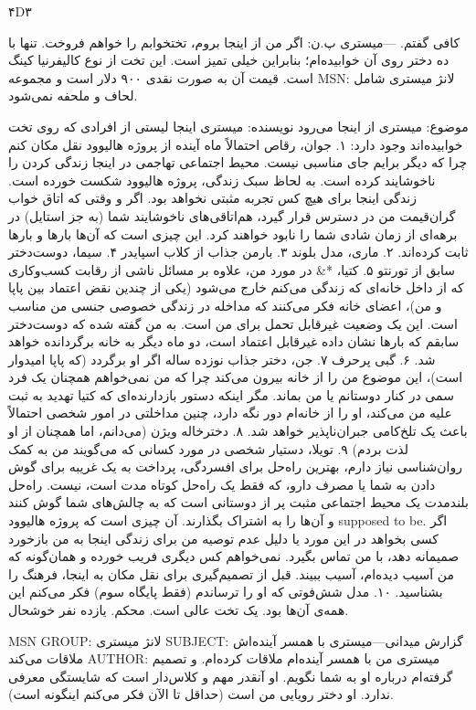 ۴D۳

کافی گفتم.
—میستری
پ.ن: اگر من از اینجا بروم، تختخوابم را خواهم فروخت. تنها با ده دختر روی آن خوابیده‌ام؛ بنابراین خیلی تمیز است. این تخت از نوع کالیفرنیا کینگ است. قیمت آن به صورت نقدی ۹۰۰ دلار است و مجموعه MSN: لانژ میستری شامل لحاف و ملحفه نمی‌شود.

موضوع: میستری از اینجا می‌رود
نویسنده: میستری
اینجا لیستی از افرادی که روی تخت خوابیده‌اند وجود دارد:
۱. جوان، رقاص
احتمالاً ماه آینده از پروژه هالیوود نقل مکان کنم چرا که دیگر برایم جای مناسبی نیست. محیط اجتماعی تهاجمی در اینجا زندگی کردن را ناخوشایند کرده است.
به لحاظ سبک زندگی، پروژه هالیوود شکست خورده است. زندگی اینجا برای هیچ کس تجربه مثبتی نخواهد بود. اگر و وقتی که اتاق خواب گران‌قیمت من در دسترس قرار گیرد، هم‌اتاقی‌های ناخوشایند شما (به جز استایل) در برهه‌ای از زمان شادی شما را نابود خواهند کرد. این چیزی است که آن‌ها بارها و بارها ثابت کرده‌اند.  
۲. ماری، مدل بلوند  
۳. بارمن جذاب از کلاب اسپایدر  
۴. سیما، دوست‌دختر سابق از تورنتو  
۵. کتیا، *&%
در مورد من، علاوه بر مسائل ناشی از رقابت کسب‌وکاری که از داخل خانه‌ای که زندگی می‌کنم خارج می‌شود (یكی از چندین نقض اعتماد بین پاپا و من)، اعضای خانه فکر می‌کنند که مداخله در زندگی خصوصی جنسی من مناسب است. این یک وضعیت غیرقابل تحمل برای من است. به من گفته شده که دوست‌دختر سابقم که بارها نشان داده غیرقابل اعتماد است، دو ماه دیگر به خانه برگردانده خواهد شد.  
۶. گبی پرحرف  
۷. جن، دختر جذاب نوزده ساله  
اگر او برگردد (که پاپا امیدوار است)، این موضوع من را از خانه بیرون می‌کند چرا که من نمی‌خواهم همچنان یک فرد سمی در کنار دوستانم یا من بماند. مگر اینکه دستور بازدارنده‌ای که کتیا تهدید به ثبت علیه من می‌کند، او را از خانه‌ام دور نگه دارد، چنین مداخلتی در امور شخصی احتمالاً باعث یک تلخ‌کامی جبران‌ناپذیر خواهد شد.  
۸. دخترخاله ویژن  (می‌دانم، اما همچنان از او لذت بردم)  
۹. تویلا، دستیار شخصی  
در مورد کسانی که می‌گویند من به کمک روان‌شناسی نیاز دارم، بهترین راه‌حل برای افسردگی، پرداخت به یک غریبه برای گوش دادن به شما یا مصرف دارو، که فقط یک راه‌حل کوتاه مدت است، نیست. راه‌حل بلندمدت یک محیط اجتماعی مثبت پر از دوستانی است که به چالش‌های شما گوش کنند و آن‌ها را به اشتراک بگذارند. آن چیزی است که پروژه هالیوود supposed to be. اگر کسی بخواهد در این مورد یا دلیل عدم توصیه من برای زندگی اینجا به من بازخورد صمیمانه دهد، با من تماس بگیرد. نمی‌خواهم کس دیگری فریب خورده و همان‌گونه که من آسیب دیده‌ام، آسیب ببیند. قبل از تصمیم‌گیری برای نقل مکان به اینجا، فرهنگ را بشناسید.  
۱۰. مدل شش‌فوتی که او را ترساندم (فقط پایگاه سوم)  
فکر می‌کنم این همه‌ی آن‌ها بود. یک تخت عالی است. محکم. یازده نفر خوشحال.  

MSN GROUP: لانژ میستری  
SUBJECT: گزارش میدانی—میستری با همسر آینده‌اش ملاقات می‌کند  
AUTHOR: میستری 
من با همسر آینده‌ام ملاقات کرده‌ام. و تصمیم گرفته‌ام درباره او به شما نگویم. او آنقدر مهم و کلاس‌دار است که شایستگی معرفی ندارد. او دختر رویایی من است (حداقل تا الآن فکر می‌کنم اینگونه است).